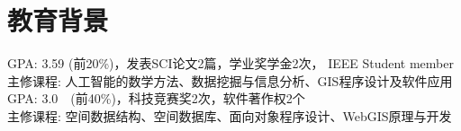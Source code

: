 \documentclass{resume}
\begin{document}




\section{教育背景}
{\small GPA: 3.59 (前20\%)，发表SCI论文2篇，学业奖学金2次， IEEE Student member\\
  主修课程: 人工智能的数学方法、数据挖掘与信息分析、GIS程序设计及软件应用}
\vspace{0.1cm}
{\small GPA: 3.0~~(前40\%)，科技竞赛奖2次，软件著作权2个\\
  主修课程: 空间数据结构、空间数据库、面向对象程序设计、WebGIS原理与开发}

\end{document}
